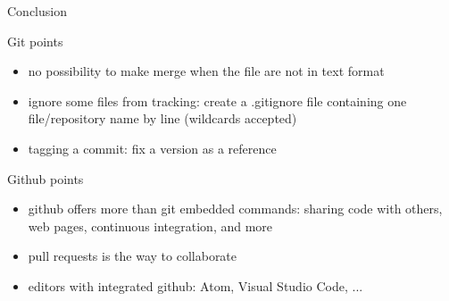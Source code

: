 \begin{frame}{Conclusion}
\begin{block}{Git points}
\begin{itemize}
    \item no possibility to make merge when the file are not in text format
    \item ignore some files from tracking: create a .gitignore file containing one file/repository name by line (wildcards accepted)
    \item tagging a commit: fix a version as a reference

\end{itemize}
\end{block}
\begin{block}{Github points}
\begin{itemize}
    \item github offers more than git embedded commands: sharing code with others, web pages, continuous integration, and more
    \item pull requests is the way to collaborate
    \item editors with integrated github: Atom, Visual Studio Code, ...
\end{itemize}
\end{block}
\end{frame}